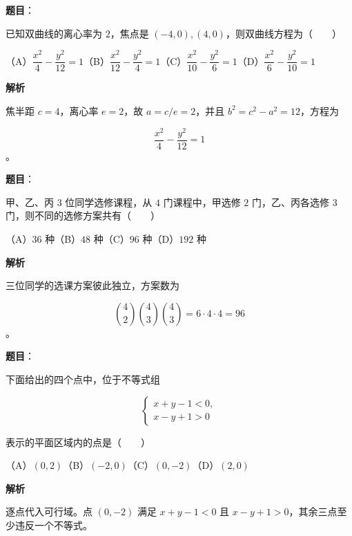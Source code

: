 \begin{answer}

\textbf{题目}：

已知双曲线的离心率为 $2$，焦点是 $(-4,0),(4,0)$，则双曲线方程为\mbox{（　　）}

（A）$\dfrac{x^2}{4}-\dfrac{y^2}{12}=1$\quad（B）$\dfrac{x^2}{12}-\dfrac{y^2}{4}=1$\quad（C）$\dfrac{x^2}{10}-\dfrac{y^2}{6}=1$\quad（D）$\dfrac{x^2}{6}-\dfrac{y^2}{10}=1$

\textbf{解析}

焦半距 $c=4$，离心率 $e=2$，故 $a=c/e=2$，并且 $b^2=c^2-a^2=12$，方程为

\nopagebreak[4]
\[
\frac{x^2}{4}-\frac{y^2}{12}=1
\]
。


\end{answer}
\begin{answer}

\textbf{题目}：

甲、乙、丙 $3$ 位同学选修课程，从 $4$ 门课程中，甲选修 $2$ 门，乙、丙各选修 $3$ 门，则不同的选修方案共有\mbox{（　　）}

（A）$36$ 种\quad（B）$48$ 种\quad（C）$96$ 种\quad（D）$192$ 种

\textbf{解析}

三位同学的选课方案彼此独立，方案数为

\nopagebreak[4]
\[
\binom42\binom43\binom43=6\cdot4\cdot4=96
\]
。


\end{answer}
\begin{answer}

\textbf{题目}：

下面给出的四个点中，位于不等式组

\nopagebreak[4]
\[
\begin{cases}
x+y-1<0,\\
x-y+1>0
\end{cases}
\]

表示的平面区域内的点是\mbox{（　　）}

（A）$(0,2)$\quad（B）$(-2,0)$\quad（C）$(0,-2)$\quad（D）$(2,0)$

\textbf{解析}

逐点代入可行域。点 $(0,-2)$ 满足 $x+y-1<0$ 且 $x-y+1>0$，其余三点至少违反一个不等式。


\end{answer}
